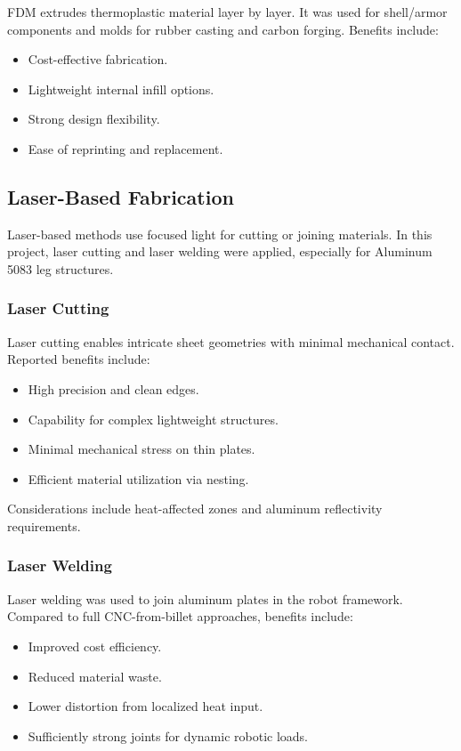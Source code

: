 FDM extrudes thermoplastic material layer by layer. It was used for shell/armor components and molds for rubber casting and carbon forging. Benefits include:
\begin{itemize}
    \item Cost-effective fabrication.
    \item Lightweight internal infill options.
    \item Strong design flexibility.
    \item Ease of reprinting and replacement.
\end{itemize}

\subsection{Laser-Based Fabrication}

Laser-based methods use focused light for cutting or joining materials. In this project, laser cutting and laser welding were applied, especially for Aluminum 5083 leg structures.

\subsubsection*{Laser Cutting}

Laser cutting enables intricate sheet geometries with minimal mechanical contact. Reported benefits include:
\begin{itemize}
    \item High precision and clean edges.
    \item Capability for complex lightweight structures.
    \item Minimal mechanical stress on thin plates.
    \item Efficient material utilization via nesting.
\end{itemize}

Considerations include heat-affected zones and aluminum reflectivity requirements.

\subsubsection*{Laser Welding}

Laser welding was used to join aluminum plates in the robot framework. Compared to full CNC-from-billet approaches, benefits include:
\begin{itemize}
    \item Improved cost efficiency.
    \item Reduced material waste.
    \item Lower distortion from localized heat input.
    \item Sufficiently strong joints for dynamic robotic loads.
\end{itemize}

